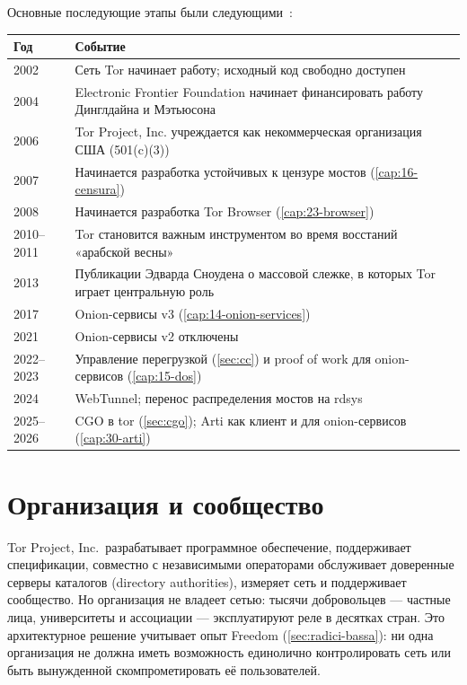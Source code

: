 Основные последующие этапы были следующими~\cite{torhistory}:
\begin{center}\small
\begin{tabularx}{\textwidth}{@{}l>{\raggedright\arraybackslash}X@{}}
\toprule
Год & Событие \\
\midrule
2002 & Сеть Tor начинает работу; исходный код свободно доступен \\
2004 & Electronic Frontier Foundation начинает финансировать работу Динглдайна и Мэтьюсона \\
2006 & Tor Project, Inc. учреждается как некоммерческая организация США (501(c)(3)) \\
2007 & Начинается разработка устойчивых к цензуре мостов (\cref{cap:16-censura}) \\
2008 & Начинается разработка Tor Browser (\cref{cap:23-browser}) \\
2010--2011 & Tor становится важным инструментом во время восстаний «арабской весны» \\
2013 & Публикации Эдварда Сноудена о массовой слежке, в которых Tor играет центральную роль \\
2017 & Onion-сервисы v3 (\cref{cap:14-onion-services}) \\
2021 & Onion-сервисы v2 отключены \\
2022--2023 & Управление перегрузкой (\cref{sec:cc}) и proof of work для onion-сервисов (\cref{cap:15-dos}) \\
2024 & WebTunnel; перенос распределения мостов на rdsys \\
2025--2026 & CGO в tor (\cref{sec:cgo}); Arti как клиент и для onion-сервисов (\cref{cap:30-arti}) \\
\bottomrule
\end{tabularx}
\end{center}

\section{Организация и сообщество}\label{sec:nascita-comunita}

Tor Project, Inc.\ разрабатывает программное обеспечение, поддерживает спецификации, совместно с независимыми операторами обслуживает доверенные серверы каталогов (directory authorities), измеряет сеть и поддерживает сообщество. Но организация не владеет сетью: тысячи добровольцев --- частные лица, университеты и ассоциации --- эксплуатируют реле в десятках стран. Это архитектурное решение учитывает опыт Freedom (\cref{sec:radici-bassa}): ни одна организация не должна иметь возможность единолично контролировать сеть или быть вынужденной скомпрометировать её пользователей.

